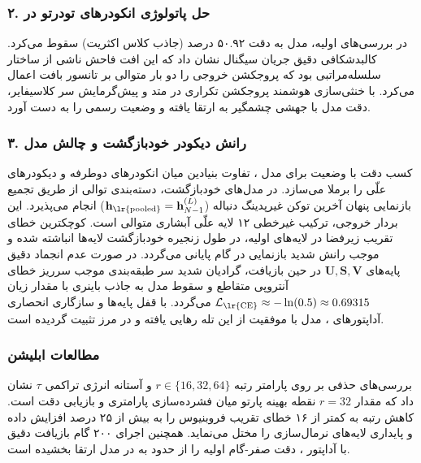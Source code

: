 \subsubsection*{۲. حل پاتولوژی انکودرهای تودرتو در }
در بررسی‌های اولیه، مدل  به دقت ۵۰.۹۲ درصد (جاذب کلاس اکثریت) سقوط می‌کرد. کالبدشکافی دقیق جریان سیگنال نشان داد که این افت فاحش ناشی از ساختار سلسله‌مراتبی  بود که پروجکشن خروجی را دو بار متوالی بر تانسور بافت اعمال می‌کرد. با خنثی‌سازی هوشمند پروجکشن تکراری در متد  و پیش‌گرمایش سر کلاسیفایر، دقت مدل با جهشی چشمگیر به  ارتقا یافته و وضعیت رسمی  را به دست آورد.

\subsubsection*{۳. رانش دیکودر خودبازگشت و چالش مدل }
کسب دقت  با وضعیت  برای مدل ، تفاوت بنیادین میان انکودرهای دوطرفه و دیکودرهای علّی را برملا می‌سازد. در مدل‌های خودبازگشت، دسته‌بندی توالی از طریق تجمیع بازنمایی پنهان آخرین توکن غیرپدینگ دنباله ($\mathbf{h}_{\text{\lr{pooled}}} = \mathbf{h}_{N-1}^{(L)}$) انجام می‌پذیرد. این بردار خروجی، ترکیب غیرخطی ۱۲ لایه علّی آبشاری متوالی است. کوچکترین خطای تقریب زیرفضا در لایه‌های اولیه، در طول زنجیره خودبازگشت لایه‌ها انباشته شده و موجب رانش شدید بازنمایی در گام پایانی می‌گردد. در صورت عدم انجماد دقیق پایه‌های $\mathbf{U}, \mathbf{S}, \mathbf{V}$ در حین بازیافت، گرادیان شدید سر طبقه‌بندی موجب سرریز خطای آنتروپی متقاطع و سقوط مدل به جاذب باینری با مقدار زیان $\mathcal{L}_{\text{\lr{CE}}} \approx -\ln(0.5) \approx 0.69315$ می‌گردد. با قفل پایه‌ها و سازگاری انحصاری آداپتورهای ، مدل با موفقیت از این تله رهایی یافته و در مرز  تثبیت گردیده است.

\subsubsection*{مطالعات ابلیشن }
بررسی‌های حذفی بر روی پارامتر رتبه $r \in \{16, 32, 64\}$ و آستانه انرژی تراکمی $\tau$ نشان داد که مقدار $r=32$ نقطه بهینه پارتو  میان فشرده‌سازی پارامتری  و بازیابی دقت است. کاهش رتبه به کمتر از ۱۶ خطای تقریب فروبنیوس را به بیش از ۲۵ درصد افزایش داده و پایداری لایه‌های نرمال‌سازی را مختل می‌نماید. همچنین اجرای ۲۰۰ گام بازیافت دقیق با آداپتور ، دقت صفر-گام اولیه را از حدود  به  در مدل  ارتقا بخشیده است.

